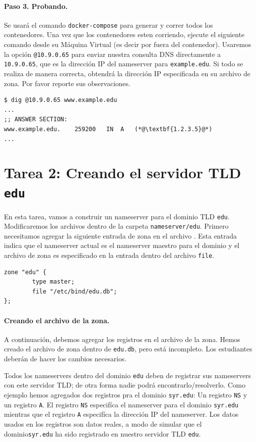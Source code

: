 \paragraph{Paso 3. Probando.} Se usará el comando \texttt{docker-compose} para generar y correr todos los contenedores. 
Una vez que los contenedores esten corriendo, ejecute el siguiente comando desde su Máquina Virtual (es decir por fuera del contenedor). Usaremos la opción  \texttt{@10.9.0.65} para enviar nuestra consulta DNS directamente a  \texttt{10.9.0.65}, que es la dirección IP del nameserver para \texttt{example.edu}. Si todo se realiza de manera correcta, obtendrá la dirección IP especificada en su archivo de zona. Por favor reporte sus observaciones.

\begin{lstlisting}
$ dig @10.9.0.65 www.example.edu
... 
;; ANSWER SECTION:
www.example.edu.    259200   IN  A   (*@\textbf{1.2.3.5}@*)
...
\end{lstlisting}



\section{Tarea 2: Creando el servidor TLD \texttt{edu}}

En esta tarea, vamos a construir un nameserver para el dominio TLD \texttt{edu}.
Modificaremos los archivos dentro de la carpeta  \texttt{nameserver/edu}.
Primero necesitamos agregar la siguiente entrada de zona en el archivo . Esta entrada indica que el nameserver actual es el nameserver maestro para el dominio y el archivo de zona es especificado en la entrada dentro del archivo \texttt{file}.


\begin{lstlisting}
zone "edu" {
        type master;
        file "/etc/bind/edu.db";
};
\end{lstlisting}


\paragraph{Creando el archivo de la zona.} A continuación, debemos agregar los registros en el archivo de la zona. Hemos creado el archivo de zona dentro de \texttt{edu.db}, pero está incompleto. Los estudiantes deberán de hacer los cambios necesarios.

Todos los nameservers dentro del dominio \texttt{edu} deben de registrar sus nameservers con este servidor TLD; de otra forma nadie podrá encontrarlo/resolverlo. Como ejemplo hemos agregados dos registros pra el dominio \texttt{syr.edu}: 
Un registro \texttt{NS} y un registro \texttt{A}.
El registro \texttt{NS} especifíca el nameserver para el dominio \texttt{syr.edu} mientras que el registro \texttt{A} especifíca la dirección IP del nameserver. Los datos usados en los registros son datos reales, a modo de simular que el dominio\texttt{syr.edu} ha sido registrado en nuestro servidor TLD \texttt{edu}.


